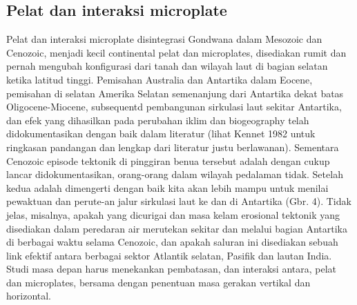 \subsection{Pelat dan interaksi microplate}

		Pelat dan interaksi microplate disintegrasi Gondwana dalam Mesozoic dan Cenozoic, menjadi kecil continental pelat dan microplates, disediakan rumit 
	dan pernah mengubah konfigurasi dari tanah dan wilayah laut di bagian selatan ketika latitud tinggi. Pemisahan Australia dan Antartika dalam Eocene, 
	pemisahan di selatan Amerika Selatan semenanjung dari Antartika dekat batas Oligocene-Miocene, subsequentd pembangunan sirkulasi laut sekitar 
	Antartika, dan efek yang dihasilkan pada perubahan iklim dan biogeography telah didokumentasikan dengan baik dalam literatur (lihat Kennet 1982 untuk 
	ringkasan pandangan dan lengkap dari literatur justu berlawanan). Sementara Cenozoic episode tektonik di pinggiran benua tersebut adalah dengan cukup 
	lancar didokumentasikan, orang-orang dalam wilayah pedalaman tidak. Setelah kedua adalah dimengerti dengan baik kita akan lebih mampu untuk menilai 
	pewaktuan dan perute-an jalur sirkulasi laut ke dan di Antartika (Gbr. 4). Tidak jelas, misalnya, apakah yang dicurigai dan masa kelam erosional tektonik 
	yang disediakan dalam peredaran air merutekan sekitar dan melalui bagian Antartika di berbagai waktu selama Cenozoic, dan apakah saluran ini disediakan 
	sebuah link efektif antara berbagai sektor Atlantik selatan, Pasifik dan lautan India. Studi masa depan harus menekankan pembatasan, dan interaksi antara, 
	pelat dan microplates, bersama dengan penentuan masa gerakan vertikal dan horizontal.
	
	
	
	

	
		
	
	
		
